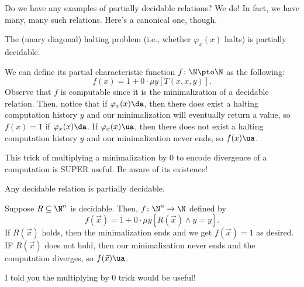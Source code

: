 \documentclass[class=article, crop=false]{standalone}
\begin{document}
Do we have any examples of partially decidable relations? We do! In fact, we have many, many such relations. Here's a canonical one, though.

\begin{ex}
  The (unary diagonal) halting problem (i.e., whether $\varphi_x(x)$ halts) is partially decidable.

  \begin{pf}
    We can define its partial characteristic function $f \colon \N \pto \N$ as the following:
      \[
        f(x) = 1 + 0 \cdot \mu y [T(x,x,y)].
      \]
    Observe that $f$ is computable since it is the minimalization of a decidable relation. Then, notice that if $\varphi_x(x) \da$, then there does exist a halting computation history $y$ and our minimalization will eventually return a value, so $f(x) = 1$ if $\varphi_x(x) \da$. If $\varphi_x(x) \ua$, then there does not exist a halting computation history $y$ and our minimalization never ends, so $f(x) \ua$.
  \end{pf}
\end{ex}
\begin{rem}
  This trick of multiplying a minimalization by $0$ to encode divergence of a computation is SUPER useful. Be aware of its existence!
\end{rem}

\begin{ex}
  Any decidable relation is partially decidable.

  \begin{pf}
    Suppose $R \subseteq \N^n$ is decidable. Then, $f \colon \N^n \to \N$ defined by
      \[
        f(\vec x) = 1 + 0\cdot \mu y[R(\vec x) \land y=y].
      \]
    If $R(\vec x)$ holds, then the minimalization ends and we get $f(\vec x) = 1$ as desired. IF $R( \vec x)$ does not hold, then our minimalization never ends and the computation diverges, so $f(\vec x) \ua$.
  \end{pf}
\end{ex}
\begin{rem}
  I told you the multiplying by $0$ trick would be useful!
\end{rem}
\end{document}
